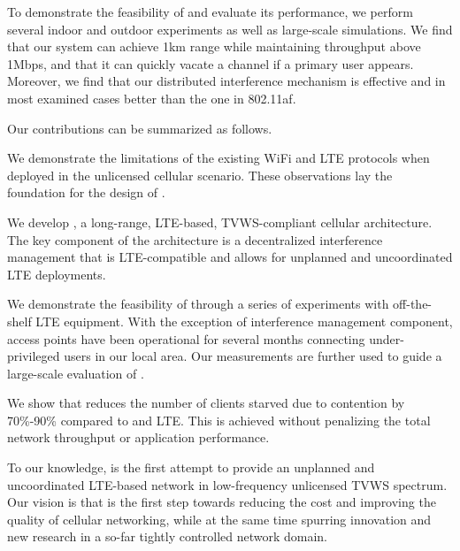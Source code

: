 

To demonstrate the feasibility of \cf and evaluate its performance, 
we perform several indoor and outdoor experiments as well as large-scale simulations. 
We find that our system can achieve 1km range while maintaining throughput above 1Mbps, and that it can quickly vacate a channel if a primary user appears. 
Moreover, we find that our distributed interference mechanism is effective and in most examined cases better than the one in 802.11af.

Our contributions can be summarized as follows. 



\begin{sitemize}
\item We demonstrate the limitations
    of the existing WiFi and LTE protocols when deployed in the unlicensed
  cellular scenario. These observations lay the foundation for the  design of \cf.  
\item We develop \cf, a long-range, LTE-based, TVWS-compliant cellular architecture. The key component of the architecture is a decentralized interference management that is LTE-compatible and allows for unplanned and uncoordinated LTE deployments. 
\item We demonstrate the feasibility of \cf through a series of experiments with off-the-shelf LTE equipment. 
With the exception of interference management component, \cf access points have been operational for several 
months connecting under-privileged users in our local area. Our measurements are further used to guide a large-scale evaluation of \cf. 
\item We show that \cf reduces the number of clients starved due to contention  by 70\%-90\% compared to \wf and LTE. This is achieved without penalizing the total network throughput or application performance.
\end{sitemize}

To our knowledge, \cf is the first attempt to provide an unplanned and uncoordinated LTE-based network in low-frequency unlicensed TVWS spectrum.
Our vision is that \cf is the first step towards reducing the cost and improving the quality of cellular networking, 
while at the same time spurring innovation and new research in a so-far tightly controlled network domain. 



